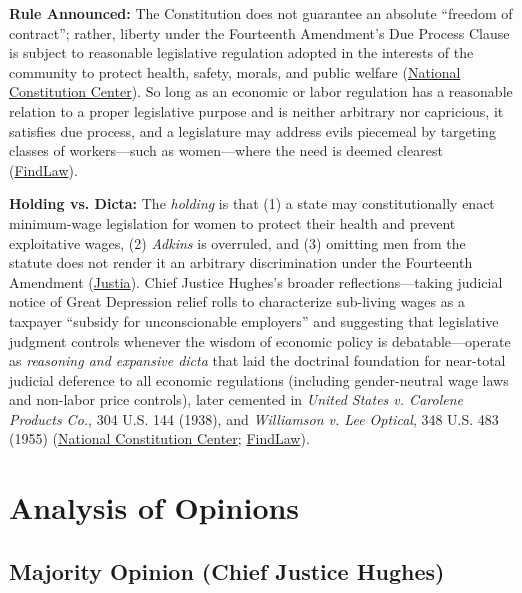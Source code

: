 \documentclass[12pt]{article}
\begin{document}
\textbf{Rule Announced:} The Constitution does not guarantee an absolute ``freedom of contract''; rather, liberty under the Fourteenth Amendment's Due Process Clause is subject to reasonable legislative regulation adopted in the interests of the community to protect health, safety, morals, and public welfare (\href{https://constitutioncenter.org/the-constitution/supreme-court-case-library/west-coast-hotel-co-v-parrish}{National Constitution Center}). So long as an economic or labor regulation has a reasonable relation to a proper legislative purpose and is neither arbitrary nor capricious, it satisfies due process, and a legislature may address evils piecemeal by targeting classes of workers---such as women---where the need is deemed clearest (\href{https://caselaw.findlaw.com/court/us-supreme-court/300/379.html}{FindLaw}).

\textbf{Holding vs. Dicta:} The \emph{holding} is that (1) a state may constitutionally enact minimum-wage legislation for women to protect their health and prevent exploitative wages, (2) \textit{Adkins} is overruled, and (3) omitting men from the statute does not render it an arbitrary discrimination under the Fourteenth Amendment (\href{https://supreme.justia.com/cases/federal/us/300/379/}{Justia}). Chief Justice Hughes's broader reflections---taking judicial notice of Great Depression relief rolls to characterize sub-living wages as a taxpayer ``subsidy for unconscionable employers'' and suggesting that legislative judgment controls whenever the wisdom of economic policy is debatable---operate as \emph{reasoning and expansive dicta} that laid the doctrinal foundation for near-total judicial deference to all economic regulations (including gender-neutral wage laws and non-labor price controls), later cemented in \textit{United States v. Carolene Products Co.}, 304 U.S. 144 (1938), and \textit{Williamson v. Lee Optical}, 348 U.S. 483 (1955) (\href{https://constitutioncenter.org/the-constitution/supreme-court-case-library/west-coast-hotel-co-v-parrish}{National Constitution Center}; \href{https://caselaw.findlaw.com/court/us-supreme-court/300/379.html}{FindLaw}).

\section{Analysis of Opinions}

\subsection{Majority Opinion (Chief Justice Hughes)}
\end{document}
